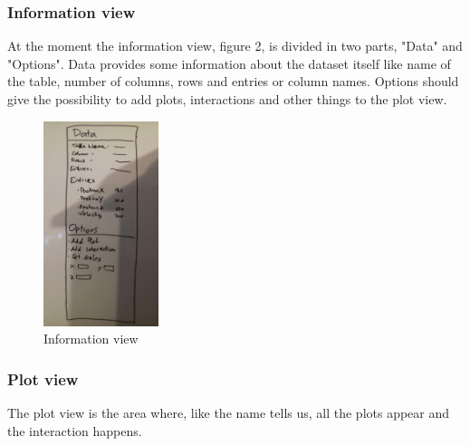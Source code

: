 \documentclass{article}
\begin{document}
\subsubsection{Information view}
At the moment the information view, figure 2, is divided in two parts, "Data" and "Options". Data provides some information about the dataset itself like name of the table, number of columns, rows and entries or column names. Options should give the possibility to add plots, interactions and other things to the plot view.
\begin{figure}[!h]
\centering
\includegraphics[width=0.3\textwidth]{images/InformationView.jpg}
	\caption{Information view}
	\label{fig2}
\end{figure}
\subsubsection{Plot view}
The plot view is the area where, like the name tells us, all the plots appear and the interaction happens.
\end{document}
